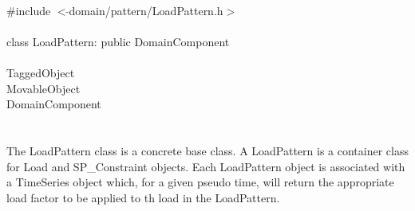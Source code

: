 
   \\
\indent \#include $<\tilde{ }$domain/pattern/LoadPattern.h$>$  \\

  \\
\indent class LoadPattern: public DomainComponent  \\

 \\
\indent TaggedObject \\
\indent MovableObject \\
\indent\indent DomainComponent \\
\indent\indent{} \\

 \\ 
\indent The LoadPattern class is a concrete base class. A
LoadPattern is a container class for Load and SP\_Constraint
objects. Each LoadPattern object is associated with a TimeSeries
object which, for a given pseudo time, will return the appropriate
load factor to be applied to th load in the LoadPattern. \\

